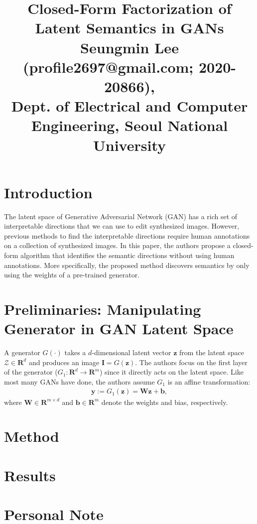\documentclass[10pt,twocolumn,letterpaper]{article}
\begin{document}
\title{Closed-Form Factorization of Latent Semantics in GANs\\ {\rm {\normalsize Seungmin Lee (profile2697@gmail.com; 2020-20866), \\Dept. of Electrical and Computer Engineering, Seoul National University}}}   %

\maketitle
\thispagestyle{empty}

\section{Introduction}
The latent space of Generative Adversarial Network (GAN) has a rich set of interpretable directions that we can use to edit synthesized images. However, previous methods to find the interpretable directions require human annotations on a collection of synthesized images. In this paper, the authors propose a closed-form algorithm that identifies the semantic directions without using human annotations. More specifically, the proposed method discovers semantics by only using the weights of a pre-trained generator.

\section{Preliminaries: Manipulating Generator in GAN Latent Space}
A generator $G(\cdot)$ takes a $d$-dimensional latent vector $\mathbf{z}$ from the latent space $\mathcal{Z} \in \mathbf{R}^d$ and produces an image $\mathbf{I} = G(\mathbf{z})$. The authors focus on the first layer of the generator ($G_1\colon \mathbf{R}^d \to \mathbf{R}^m$) since it directly acts on the latent space. Like most many GANs have done, the authors assume $G_1$ is an affine transformation:
\begin{align*}
    \mathbf{y} := G_1(\mathbf{z}) = \mathbf{W}\mathbf{z} + \mathbf{b},
\end{align*}
where $\mathbf{W} \in \mathbf{R}^{m \times d}$ and $\mathbf{b} \in \mathbf{R}^m$ denote the weights and bias, respectively.

\section{Method}

\section{Results}

\section{Personal Note}


{\small


}
\end{document}
